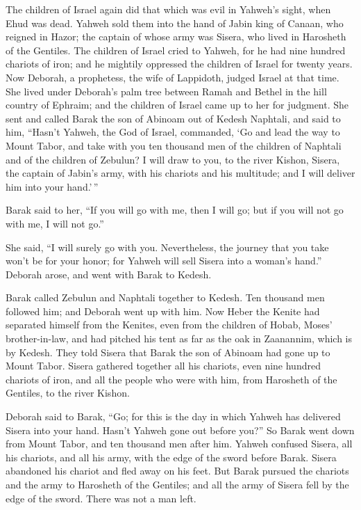 The children of Israel again did that which was evil in
Yahweh's sight, when Ehud was dead.  Yahweh sold them into
the hand of Jabin king of Canaan, who reigned in Hazor; the captain of
whose army was Sisera, who lived in Harosheth of the Gentiles.
 The children of Israel cried to Yahweh, for he had nine
hundred chariots of iron; and he mightily oppressed the children of
Israel for twenty years.  Now Deborah, a prophetess, the
wife of Lappidoth, judged Israel at that time.  She lived
under Deborah's palm tree between Ramah and Bethel in the hill country
of Ephraim; and the children of Israel came up to her for judgment.
 She sent and called Barak the son of Abinoam out of Kedesh
Naphtali, and said to him, ``Hasn't Yahweh, the God of Israel,
commanded, `Go and lead the way to Mount Tabor, and take with you ten
thousand men of the children of Naphtali and of the children of Zebulun?
 I will draw to you, to the river Kishon, Sisera, the
captain of Jabin's army, with his chariots and his multitude; and I will
deliver him into your hand.'\,''

 Barak said to her, ``If you will go with me, then I will
go; but if you will not go with me, I will not go.''

 She said, ``I will surely go with you. Nevertheless, the
journey that you take won't be for your honor; for Yahweh will sell
Sisera into a woman's hand.'' Deborah arose, and went with Barak to
Kedesh.

 Barak called Zebulun and Naphtali together to Kedesh. Ten
thousand men followed him; and Deborah went up with him. 
Now Heber the Kenite had separated himself from the Kenites, even from
the children of Hobab, Moses' brother-in-law, and had pitched his tent
as far as the oak in Zaanannim, which is by Kedesh.  They
told Sisera that Barak the son of Abinoam had gone up to Mount Tabor.
 Sisera gathered together all his chariots, even nine
hundred chariots of iron, and all the people who were with him, from
Harosheth of the Gentiles, to the river Kishon.

 Deborah said to Barak, ``Go; for this is the day in which
Yahweh has delivered Sisera into your hand. Hasn't Yahweh gone out
before you?'' So Barak went down from Mount Tabor, and ten thousand men
after him.  Yahweh confused Sisera, all his chariots, and
all his army, with the edge of the sword before Barak. Sisera abandoned
his chariot and fled away on his feet.  But Barak pursued
the chariots and the army to Harosheth of the Gentiles; and all the army
of Sisera fell by the edge of the sword. There was not a man left.

